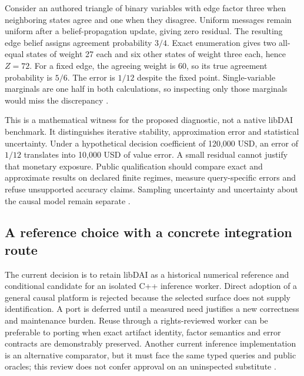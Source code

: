 Consider an authored triangle of binary variables with edge factor three
when neighboring states agree and one when they disagree. Uniform messages
remain uniform after a belief-propagation update, giving zero residual.
The resulting edge belief assigns agreement probability $3/4$. Exact
enumeration gives two all-equal states of weight 27 each and six other
states of weight three each, hence $Z=72$. For a fixed edge, the agreeing
weight is 60, so its true agreement probability is $5/6$. The error is
$1/12$ despite the fixed point. Single-variable marginals are one half in
both calculations, so inspecting only those marginals would miss the
discrepancy \cite{exec24_libdai_choice}.

This is a mathematical witness for the proposed diagnostic, not a native
libDAI benchmark. It distinguishes iterative stability, approximation error
and statistical uncertainty. Under a hypothetical decision coefficient of
120,000 USD, an error of $1/12$ translates into 10,000 USD of value error.
A small residual cannot justify that monetary exposure. Public qualification
should compare exact and approximate results on declared finite regimes,
measure query-specific errors and refuse unsupported accuracy claims.
Sampling uncertainty and uncertainty about the causal model remain separate
\cite{exec24_libdai_choice}.

\subsection{A reference choice with a concrete integration route}
The current decision is to retain libDAI as a historical numerical reference
and conditional candidate for an isolated C++ inference worker. Direct
adoption of a general causal platform is rejected because the selected
surface does not supply identification. A port is deferred until a measured
need justifies a new correctness and maintenance burden. Reuse through a
rights-reviewed worker can be preferable to porting when exact artifact
identity, factor semantics and error contracts are demonstrably preserved.
Another current inference implementation is an alternative comparator,
but it must face the same typed queries and public oracles; this review does
not confer approval on an uninspected substitute \cite{exec24_libdai_choice}.

